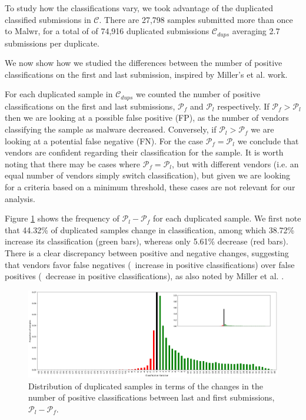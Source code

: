 To study how the classifications vary, we took advantage of the duplicated classified submissions in $\mathcal{C}$. There are 27,798 samples submitted more than once to Malwr, for a total of of 74,916
duplicated submissions $\mathcal{C}_{dups}$ averaging 2.7 submissions per
duplicate.

We now show how we studied the differences between the number of positive classifications on the first and last submission, inspired by Miller's et al. \cite{miller:rev_int} work.

For each duplicated sample in $\mathcal{C}_{dups}$ we counted the number
of positive classifications on the first and last submissions, $\mathcal{P}_f$ and $\mathcal{P}_l$ respectively.
If $\mathcal{P}_f > \mathcal{P}_l$ then we are looking
at a possible false positive (FP), as the number of vendors
classifying the sample as malware decreased.
Conversely, if
$\mathcal{P}_l > \mathcal{P}_f$ we are looking at a potential false negative (FN).
For the case $\mathcal{P}_f = \mathcal{P}_l$ we conclude that vendors are confident regarding their classification for the sample. It is worth noting that there may be cases where $\mathcal{P}_f = \mathcal{P}_l$, but with different vendors (i.e. an equal number of vendors simply switch classification), but given we are looking for a criteria based on a minimum threshold, these cases are not relevant for our analysis.

Figure \ref{fig:dups_frequency} shows the frequency of $\mathcal{P}_l-\mathcal{P}_f$ for each duplicated
sample.
We first note that 44.32\% of duplicated samples change in classification, among which 38.72\% increase its classification (green bars), whereas only 5.61\% decrease (red bars).
There is a clear discrepancy between positive and negative changes, suggesting that vendors favor false negatives (\ie\ increase in positive classifications) over false positives (\ie\ decrease in positive classifications), as also noted by Miller et al. \cite{miller:rev_int}.

\begin{figure}[!htb]
	\centering
	\includegraphics[width=\textwidth]{Figures/dups_frequency.png}
	\caption[Distribution of duplicated samples.]{Distribution of duplicated samples in terms of the changes in the number of
positive classifications between last and first submissions, $\mathcal{P}_l-\mathcal{P}_f$.}
	\label{fig:dups_frequency}
\end{figure}

